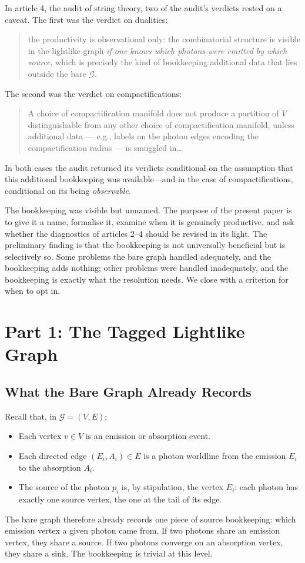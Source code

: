 \documentclass[11pt]{article}
\begin{document}
In article 4, the audit of string theory, two of the audit's verdicts rested on a caveat. The first was the verdict on dualities:
\begin{quote}
the productivity is observational only: the combinatorial structure is visible in the lightlike graph \emph{if one knows which photons were emitted by which source}, which is precisely the kind of bookkeeping additional data that lies outside the bare $\mathcal{G}$.
\end{quote}
The second was the verdict on compactifications:
\begin{quote}
A choice of compactification manifold does not produce a partition of $V$ distinguishable from any other choice of compactification manifold, unless additional data --- e.g., labels on the photon edges encoding the compactification radius --- is smuggled in\ldots
\end{quote}
In both cases the audit returned its verdicts conditional on the assumption that this additional bookkeeping was available---and in the case of compactifications, conditional on its being \emph{observable}.

The bookkeeping was visible but unnamed. The purpose of the present paper is to give it a name, formalise it, examine when it is genuinely productive, and ask whether the diagnostics of articles 2--4 should be revised in its light. The preliminary finding is that the bookkeeping is not universally beneficial but is selectively so. Some problems the bare graph handled adequately, and the bookkeeping adds nothing; other problems were handled inadequately, and the bookkeeping is exactly what the resolution needs. We close with a criterion for when to opt in.

\section{Part 1: The Tagged Lightlike Graph}

\label{sec:tagged}

\subsection{What the Bare Graph Already Records}

Recall that, in $\mathcal{G} = (V, E)$:
\begin{itemize}
    \item Each vertex $v \in V$ is an emission or absorption event.
    \item Each directed edge $(E_i, A_i) \in E$ is a photon worldline from the emission $E_i$ to the absorption $A_i$.
    \item The source of the photon $p_i$ is, by stipulation, the vertex $E_i$: each photon has exactly one source vertex, the one at the tail of its edge.
\end{itemize}
The bare graph therefore already records one piece of source bookkeeping: which emission vertex a given photon came from. If two photons share an emission vertex, they share a source. If two photons converge on an absorption vertex, they share a sink. The bookkeeping is trivial at this level.
\end{document}
